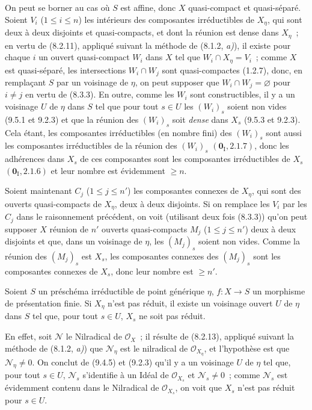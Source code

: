 On peut se borner au cas où $S$ est affine, donc $X$ quasi-compact et
quasi-séparé. Soient $V_i$ ($1\leqslant i\leqslant n$) les intérieurs des
composantes irréductibles de $X_\eta$, qui sont deux à deux disjoints et
quasi-compacts, et dont la réunion est dense dans $X_\eta$~; en vertu de
(8.2.11), appliqué suivant la méthode de (8.1.2, \emph{a)}), il existe pour
chaque $i$ un ouvert quasi-compact $W_i$ dans $X$ tel que
$W_i\cap X_\eta=V_i$~; comme $X$ est quasi-séparé, les intersections
$W_i\cap W_j$ sont quasi-compactes (1.2.7), donc, en remplaçant $S$
par un voisinage de $\eta$, on peut supposer que $W_i\cap W_j=\varnothing$ pour
$i\neq j$ en vertu de (8.3.3). En outre, comme les $W_i$ sont constructibles,
il y a un voisinage $U$ de $\eta$ dans $S$ tel que pour tout $s\in U$ les
$(W_i)_s$ soient non vides (9.5.1 et 9.2.3) et que la réunion des $(W_i)_s$ soit
\emph{dense} dans $X_s$ (9.5.3 et 9.2.3). Cela étant, les composantes
irréductibles (en nombre fini) des $(W_i)_s$ sont aussi les composantes
irréductibles de la réunion des $(W_i)_s$ $(\mathbf 0_{\mathrm I},2.1.7)$, donc
les adhérences dans $X_s$ de ces composantes sont les composantes
irréductibles de $X_s$ $(\mathbf 0_{\mathrm I},2.1.6)$ et leur nombre est
évidemment $\geqslant n$.

Soient maintenant $C_j$ ($1\leqslant j\leqslant n'$) les composantes connexes
de $X_\eta$, qui sont des ouverts quasi-compacts de $X_\eta$, deux à deux
disjoints. Si on remplace les $V_i$ par les $C_j$ dans le raisonnement
précédent, on voit (utilisant deux fois (8.3.3)) qu'on peut supposer $X$ réunion
de $n'$ ouverts quasi-compacts $M_j$ ($1\leqslant j\leqslant n'$) deux à deux
disjoints et que, dans un voisinage de $\eta$, les $(M_j)_s$ soient non vides.
Comme la réunion des $(M_j)_s$ est $X_s$, les composantes connexes des $(M_j)_s$
sont les composantes connexes de $X_s$, donc leur nombre est $\geqslant n'$.


\begin{lemma}[9.7.2]
\label{IV.9.7.2-fr}
Soient $S$ un préschéma irréductible de point générique $\eta$, $f:X\to S$
un morphisme de présentation finie. Si $X_\eta$ n'est pas réduit, il existe un
voisinage ouvert $U$ de $\eta$ dans $S$ tel que, pour tout $s\in U$, $X_s$ ne
soit pas réduit.
\end{lemma}

En effet, soit $\mathcal N$ le Nilradical de $\mathcal O_X$~; il résulte de
(8.2.13), appliqué suivant la méthode de (8.1.2, \emph{a)}) que $\mathcal N_\eta$
est le nilradical de $\mathcal O_{X_\eta}$, et l'hypothèse est que
$\mathcal N_\eta\neq0$. On conclut de (9.4.5) et (9.2.3) qu'il y a un voisinage
$U$ de $\eta$ tel que, pour tout $s\in U$, $\mathcal N_s$ s'identifie à un Idéal
de $\mathcal O_{X_s}$ et $\mathcal N_s\neq0$~; comme $\mathcal N_s$ est
évidemment contenu dans le Nilradical de $\mathcal O_{X_s}$, on voit que $X_s$
n'est pas réduit pour $s\in U$.

